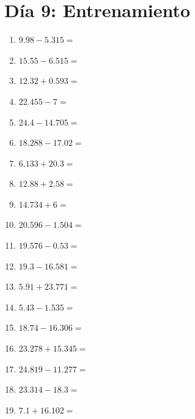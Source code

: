 \documentclass[12pt]{article}
\begin{document}
\section*{Día 9: Entrenamiento}
\begin{enumerate}
\item \large $ 9.98 - 5.315 = $ \vspace{1.5cm}
\item \large $ 15.55 - 6.515 = $ \vspace{1.5cm}
\item \large $ 12.32 + 0.593 = $ \vspace{1.5cm}
\item \large $ 22.455 - 7 = $ \vspace{1.5cm}
\item \large $ 24.4 - 14.705 = $ \vspace{1.5cm}
\item \large $ 18.288 - 17.02 = $ \vspace{1.5cm}
\item \large $ 6.133 + 20.3 = $ \vspace{1.5cm}
\item \large $ 12.88 + 2.58 = $ \vspace{1.5cm}
\item \large $ 14.734 + 6 = $ \vspace{1.5cm}
\item \large $ 20.596 - 1.504 = $ \vspace{1.5cm}
\newpage
\item \large $ 19.576 - 0.53 = $ \vspace{1.5cm}
\item \large $ 19.3 - 16.581 = $ \vspace{1.5cm}
\item \large $ 5.91 + 23.771 = $ \vspace{1.5cm}
\item \large $ 5.43 - 1.535 = $ \vspace{1.5cm}
\item \large $ 18.74 - 16.306 = $ \vspace{1.5cm}
\item \large $ 23.278 + 15.345 = $ \vspace{1.5cm}
\item \large $ 24.819 - 11.277 = $ \vspace{1.5cm}
\item \large $ 23.314 - 18.3 = $ \vspace{1.5cm}
\item \large $ 7.1 + 16.102 = $ \vspace{1.5cm}

\end{enumerate}
\end{document}
